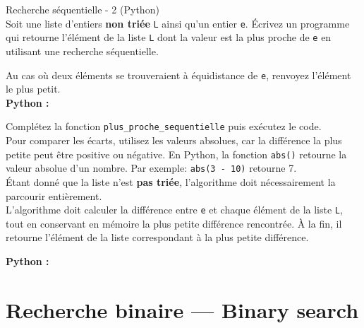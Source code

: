     \begin{Exercice}[10 minutes] Recherche séquentielle - 2 (Python)\\
    
    Soit une liste d’entiers \textbf{non triée} \texttt{L} ainsi qu’un entier \texttt{e}. Écrivez un programme qui retourne l'élément de la liste \lstinline{L} dont la valeur est la plus proche de \texttt{e} en utilisant une recherche séquentielle.\\
    \begin{exemple}
        
    \end{exemple}
    Au cas où deux éléments se trouveraient à équidistance de \lstinline{e}, renvoyez l'élément le plus petit.\\
    
    \textbf{Python :}
        
        \begin{conseil}
        Complétez la fonction \texttt{plus\_proche\_sequentielle} puis exécutez le code. \\

        Pour comparer les écarts, utilisez les valeurs absolues, car la différence la plus petite peut être positive ou négative. En Python, la fonction \lstinline{abs()} retourne la valeur absolue d'un nombre. Par exemple: \lstinline{abs(3 - 10)} retourne 7.\\

        Étant donné que la liste n'est \textbf{pas triée}, l'algorithme doit nécessairement la parcourir entièrement. \\

        L'algorithme doit calculer la différence entre \texttt{e} et chaque élément de la liste \texttt{L}, tout en conservant en mémoire la plus petite différence rencontrée. À la fin, il retourne l'élément de la liste correspondant à la plus petite différence.
        \end{conseil}
        
        \begin{solution}
        \textbf{Python :}
            
            
        \end{solution}
        
    \end{Exercice}
    
    \section{Recherche binaire — Binary search}
    
